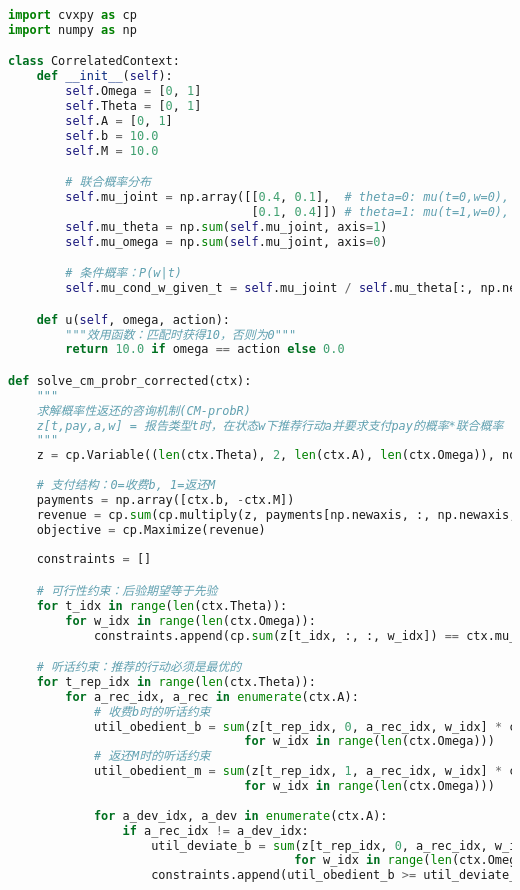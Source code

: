 \begin{lstlisting}[language=Python,style=pythonstyle]
import cvxpy as cp
import numpy as np

class CorrelatedContext:
    def __init__(self):
        self.Omega = [0, 1]
        self.Theta = [0, 1]
        self.A = [0, 1]
        self.b = 10.0  
        self.M = 10.0  

        # 联合概率分布
        self.mu_joint = np.array([[0.4, 0.1],  # theta=0: mu(t=0,w=0), mu(t=0,w=1)
                                  [0.1, 0.4]]) # theta=1: mu(t=1,w=0), mu(t=1,w=1)
        self.mu_theta = np.sum(self.mu_joint, axis=1) 
        self.mu_omega = np.sum(self.mu_joint, axis=0) 

        # 条件概率：P(w|t)
        self.mu_cond_w_given_t = self.mu_joint / self.mu_theta[:, np.newaxis]

    def u(self, omega, action):
        """效用函数：匹配时获得10，否则为0"""
        return 10.0 if omega == action else 0.0

def solve_cm_probr_corrected(ctx):
    """
    求解概率性返还的咨询机制(CM-probR)
    z[t,pay,a,w] = 报告类型t时，在状态w下推荐行动a并要求支付pay的概率*联合概率
    """
    z = cp.Variable((len(ctx.Theta), 2, len(ctx.A), len(ctx.Omega)), nonneg=True)
    
    # 支付结构：0=收费b, 1=返还M
    payments = np.array([ctx.b, -ctx.M])
    revenue = cp.sum(cp.multiply(z, payments[np.newaxis, :, np.newaxis, np.newaxis]))
    objective = cp.Maximize(revenue)
    
    constraints = []

    # 可行性约束：后验期望等于先验
    for t_idx in range(len(ctx.Theta)):
        for w_idx in range(len(ctx.Omega)):
            constraints.append(cp.sum(z[t_idx, :, :, w_idx]) == ctx.mu_joint[t_idx, w_idx])

    # 听话约束：推荐的行动必须是最优的
    for t_rep_idx in range(len(ctx.Theta)):
        for a_rec_idx, a_rec in enumerate(ctx.A):
            # 收费b时的听话约束
            util_obedient_b = sum(z[t_rep_idx, 0, a_rec_idx, w_idx] * ctx.u(ctx.Omega[w_idx], a_rec) 
                                 for w_idx in range(len(ctx.Omega)))
            # 返还M时的听话约束
            util_obedient_m = sum(z[t_rep_idx, 1, a_rec_idx, w_idx] * ctx.u(ctx.Omega[w_idx], a_rec) 
                                 for w_idx in range(len(ctx.Omega)))
            
            for a_dev_idx, a_dev in enumerate(ctx.A):
                if a_rec_idx != a_dev_idx:
                    util_deviate_b = sum(z[t_rep_idx, 0, a_rec_idx, w_idx] * ctx.u(ctx.Omega[w_idx], a_dev) 
                                        for w_idx in range(len(ctx.Omega)))
                    constraints.append(util_obedient_b >= util_deviate_b)
                    

\end{lstlisting}

